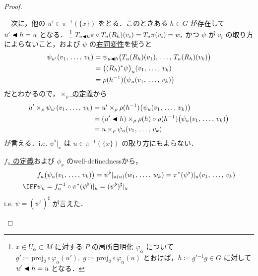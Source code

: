 \documentclass[TQFT_main]{subfiles}
\begin{document}
\begin{proof}
\begin{enumerate}
\begin{description}
\begin{description}
                　次に，他の $u' \in \pi^{-1}(\{x\})$ をとる．このときある $h \in G$ が存在して $u' \blacktriangleleft h = u$ となる．
                \footnote{
                    $x \in U_\alpha \subset M$ に対する $P$ の局所自明化 $\varphi_\alpha$ について $g' \coloneqq \mathrm{proj}_2 \circ \varphi_\alpha (u'),\; g \coloneqq \mathrm{proj}_2 \circ \varphi_\alpha (u)$ とおけば，$h \coloneqq g'{}^{-1}g \in G$ に対して $u' \blacktriangleleft h = u$ となる．
                }
                $T_{u \blacktriangleleft h} \pi \circ T_{u} (R_{h})(v_i) = T_{u} \pi (v_i) = w_i$ かつ $\psi$ が $v_i$ の取り方によらないこと，および $\psi$ の\hyperref[def:tensorial-form]{右同変性}を使うと
                \begin{align}
                    \psi_{u'} (v_1,\, \dots,\, v_k)
                    &= \psi_{u \blacktriangleleft h} \bigl(T_{u}(R_h)(v_1),\, \dots,\, T_{u}(R_h)(v_k)\bigr) \\
                    &= \bigl((R_h)^* \psi\bigr)_u (v_1,\, \dots,\, v_k) \\
                    &= \rho(h^{-1})\bigl(\psi_u (v_1,\, \dots,\, v_k)\bigr)
                \end{align}
                だとわかるので，\hyperref[prop:Borelconst]{$\times_\rho$ の定義}から
                \begin{align}
                    u' \times_\rho \psi_{u'} (v_1,\, \dots,\, v_k)
                    &= u ' \times_\rho \rho(h^{-1})\bigl(\psi_u (v_1,\, \dots,\, v_k)\bigr) \\
                    &= (u ' \blacktriangleleft h) \times_\rho \rho(h) \circ \rho(h^{-1})\bigl(\psi_u (v_1,\, \dots,\, v_k)\bigr) \\
                    &= u \times_\rho \psi_u (v_1,\, \dots,\, v_k)
                \end{align}
                が言える．i.e. $\psi^\flat|_x$ は $u \in \pi^{-1}(\{x\})$ の取り方にもよらない．
            \end{description}
            \hyperref[lem:assoc-basic]{$f_u$ の定義}および $\phi_x$ のwell-definednessから，
            \begin{align}
                &f_u \bigl(\psi_u(v_1,\, \dots,\, v_k)\bigr) = \psi^\flat|_{\pi(u)}(w_1,\, \dots,\, w_k) = \pi^* (\psi^\flat)|_u (v_1,\, \dots,\, v_k) \\
                \IFF &\psi_u = f_u^{-1} \circ \pi^* (\psi^\flat)|_u = (\psi^\flat)^\sharp|_u
            \end{align}
            i.e. $\psi = (\psi^\flat)^\sharp$ が言えた．
        \end{description}

\end{enumerate}
\end{proof}
\end{document}
